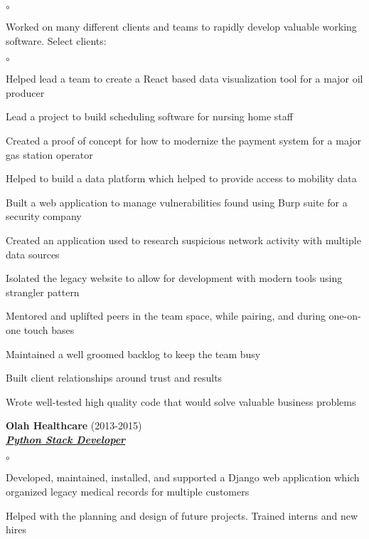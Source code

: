 \documentclass{article}
\newcommand{\employer}[3]{{ \textbf{#1} (#2)\\ \underline{\textbf{\emph{#3}}}\\  }}
\newenvironment{achievements}{\begin{list}{$\circ$}{\topsep 0pt \itemsep -2pt}}{\vspace*{4pt}\end{list}}
\begin{document}
	\begin{achievements}
	\item Worked on many different clients and teams to rapidly develop valuable working software. Select clients:
	\begin{achievements}
		\item Helped lead a team to create a React based data visualization tool for a major oil producer
		\item Lead a project to build scheduling software for nursing home staff
		\item Created a proof of concept for how to modernize the payment system for a major gas station operator
		\item Helped to build a data platform which helped to provide access to mobility data
		\item Built a web application to manage vulnerabilities found using Burp suite for a security company
		\item Created an application used to research suspicious network activity with multiple data sources
		\item Isolated the legacy website to allow for development with modern tools using strangler pattern
	\end{achievements}
	\item Mentored and uplifted peers in the team space, while pairing, and during one-on-one touch bases
	\item Maintained a well groomed backlog to keep the team busy
	\item Built client relationships around trust and results
	\item Wrote well-tested high quality code that would solve valuable business problems
	\end{achievements}

\employer{Olah Healthcare}{2013-2015}{Python Stack Developer}
	\begin{achievements}
	\item Developed, maintained, installed, and supported a Django web application which organized legacy medical records for multiple
	      customers
	\item Helped with the planning and design of future projects. Trained interns and new hires
	\end{achievements}
\end{document}
